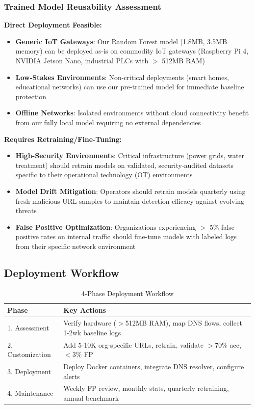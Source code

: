 \documentclass[conference]{IEEEtran}
\begin{document}
\subsubsection{Trained Model Reusability Assessment}

\textbf{Direct Deployment Feasible:}
\begin{itemize}
\item \textbf{Generic IoT Gateways}: Our Random Forest model (1.8MB, 3.5MB memory) can be deployed as-is on commodity IoT gateways (Raspberry Pi 4, NVIDIA Jetson Nano, industrial PLCs with $>$ 512MB RAM)
\item \textbf{Low-Stakes Environments}: Non-critical deployments (smart homes, educational networks) can use our pre-trained model for immediate baseline protection
\item \textbf{Offline Networks}: Isolated environments without cloud connectivity benefit from our fully local model requiring no external dependencies
\end{itemize}

\textbf{Requires Retraining/Fine-Tuning:}
\begin{itemize}
\item \textbf{High-Security Environments}: Critical infrastructure (power grids, water treatment) should retrain models on validated, security-audited datasets specific to their operational technology (OT) environments
\item \textbf{Model Drift Mitigation}: Operators should retrain models quarterly using fresh malicious URL samples to maintain detection efficacy against evolving threats
\item \textbf{False Positive Optimization}: Organizations experiencing $>$ 5\% false positive rates on internal traffic should fine-tune models with labeled logs from their specific network environment
\end{itemize}

\subsection{Deployment Workflow}

{\small
\begin{table}[htbp]
\centering
\caption{4-Phase Deployment Workflow}
{\footnotesize
\begin{tabular}{lp{5cm}}
\toprule
Phase & Key Actions \\
\midrule
1. Assessment & Verify hardware ($>$512MB RAM), map DNS flows, collect 1-2wk baseline logs \\
2. Customization & Add 5-10K org-specific URLs, retrain, validate $>$70\% acc, $<$3\% FP \\
3. Deployment & Deploy Docker containers, integrate DNS resolver, configure alerts \\
4. Maintenance & Weekly FP review, monthly stats, quarterly retraining, annual benchmark \\
\bottomrule
\end{tabular}
}
\end{table}
}
\end{document}
